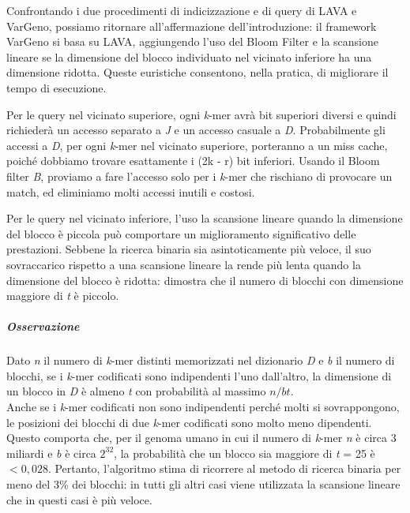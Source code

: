 \documentclass[../main.tex]{subfiles}
\begin{document}
\noindent
Confrontando i due procedimenti di indicizzazione e di query di LAVA e VarGeno, possiamo ritornare all'affermazione dell'introduzione: il framework VarGeno si basa su LAVA, aggiungendo l'uso del Bloom Filter e la scansione lineare se la dimensione del blocco individuato nel vicinato inferiore ha una dimensione ridotta. Queste euristiche consentono, nella pratica, di migliorare il tempo di esecuzione.

Per le query nel vicinato superiore, ogni \textit{k}-mer avrà bit superiori diversi e quindi richiederà un accesso separato a \textit{J} e un accesso casuale a \textit{D}. Probabilmente gli accessi a \textit{D}, per ogni \textit{k}-mer nel vicinato superiore, porteranno a un miss cache, poiché dobbiamo trovare esattamente i (2k - r) bit inferiori. Usando il Bloom filter \textit{B}, proviamo a fare l'accesso solo per i \textit{k}-mer che rischiano di provocare un match, ed eliminiamo molti accessi inutili e costosi.

Per le query nel vicinato inferiore, l'uso la scansione lineare quando la dimensione del blocco è piccola può comportare un miglioramento significativo delle prestazioni. Sebbene la ricerca binaria sia asintoticamente più veloce, il suo sovraccarico rispetto a una scansione lineare la rende più lenta quando la dimensione del blocco è ridotta: \cite{sun-medvedev2018vargeno} dimostra che il numero di blocchi con dimensione maggiore di \textit{t} è piccolo. 

\subparagraph{Osservazione} Dato \textit{n} il numero di \textit{k}-mer distinti memorizzati nel dizionario \textit{D} e \textit{b} il numero di blocchi, se i \textit{k}-mer codificati sono indipendenti l'uno dall'altro, la dimensione di un blocco in \textit{D} è almeno \textit{t} con probabilità al massimo $n/bt$. \\

\noindent
Anche se i \textit{k}-mer codificati non sono indipendenti perché molti si sovrappongono, le posizioni dei blocchi di due \textit{k}-mer codificati sono molto meno dipendenti.  Questo comporta che, per il genoma umano in cui il numero di \textit{k}-mer \textit{n} è circa 3 miliardi e \textit{b} è circa $2^{32}$, la probabilità che un blocco sia maggiore di \textit{t} = 25 è $<0,028$. Pertanto, l'algoritmo stima di ricorrere al metodo di ricerca binaria per meno del 3\% dei blocchi: in tutti gli altri casi viene utilizzata la scansione lineare che in questi casi è più veloce.\\
\end{document}
